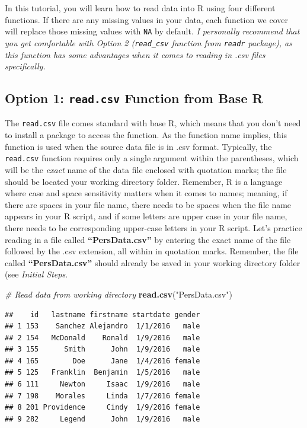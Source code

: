 \documentclass[]{book}
\newenvironment{Shaded}{\begin{snugshade}}{\end{snugshade}}
\newcommand{\KeywordTok}[1]{\textcolor[rgb]{0.13,0.29,0.53}{\textbf{#1}}}
\newcommand{\StringTok}[1]{\textcolor[rgb]{0.31,0.60,0.02}{#1}}
\newcommand{\CommentTok}[1]{\textcolor[rgb]{0.56,0.35,0.01}{\textit{#1}}}
\newcommand{\NormalTok}[1]{#1}
\begin{document}
In this tutorial, you will learn how to read data into R using four
different functions. If there are any missing values in your data, each
function we cover will replace those missing values with \texttt{NA} by
default. \emph{I personally recommend that you get comfortable with
Option 2 (\texttt{read\_csv} function from \texttt{readr} package), as
this function has some advantages when it comes to reading in .csv files
specifically.}

\subsection{\texorpdfstring{Option 1: \texttt{read.csv} Function from
Base
R}{Option 1: read.csv Function from Base R}}\label{option-1-read.csv-function-from-base-r}

The \texttt{read.csv} file comes standard with base R, which means that
you don't need to install a package to access the function. As the
function name implies, this function is used when the source data file
is in .csv format. Typically, the \texttt{read.csv} function requires
only a single argument within the parentheses, which will be the
\emph{exact} name of the data file enclosed with quotation marks; the
file should be located your working directory folder. Remember, R is a
language where case and space sensitivity matters when it comes to
names; meaning, if there are spaces in your file name, there needs to be
spaces when the file name appears in your R script, and if some letters
are upper case in your file name, there needs to be corresponding
upper-case letters in your R script. Let's practice reading in a file
called \textbf{``PersData.csv''} by entering the exact name of the file
followed by the .csv extension, all within in quotation marks. Remember,
the file called \textbf{``PersData.csv''} should already be saved in
your working directory folder (see \emph{Initial Steps}.

\begin{Shaded}
\begin{Highlighting}[]
\CommentTok{# Read data from working directory}
\KeywordTok{read.csv}\NormalTok{(}\StringTok{"PersData.csv"}\NormalTok{)}
\end{Highlighting}
\end{Shaded}

\begin{verbatim}
##    id   lastname firstname startdate gender
## 1 153    Sanchez Alejandro  1/1/2016   male
## 2 154   McDonald    Ronald  1/9/2016   male
## 3 155      Smith      John  1/9/2016   male
## 4 165        Doe      Jane  1/4/2016 female
## 5 125   Franklin  Benjamin  1/5/2016   male
## 6 111     Newton     Isaac  1/9/2016   male
## 7 198    Morales     Linda  1/7/2016 female
## 8 201 Providence     Cindy  1/9/2016 female
## 9 282     Legend      John  1/9/2016   male
\end{verbatim}
\end{document}
